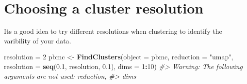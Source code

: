 \documentclass[
]{book}
\newenvironment{Shaded}{\begin{snugshade}}{\end{snugshade}}
\newcommand{\AttributeTok}[1]{\textcolor[rgb]{0.13,0.29,0.53}{#1}}
\newcommand{\CommentTok}[1]{\textcolor[rgb]{0.56,0.35,0.01}{\textit{#1}}}
\newcommand{\DecValTok}[1]{\textcolor[rgb]{0.00,0.00,0.81}{#1}}
\newcommand{\FloatTok}[1]{\textcolor[rgb]{0.00,0.00,0.81}{#1}}
\newcommand{\FunctionTok}[1]{\textcolor[rgb]{0.13,0.29,0.53}{\textbf{#1}}}
\newcommand{\NormalTok}[1]{#1}
\newcommand{\OtherTok}[1]{\textcolor[rgb]{0.56,0.35,0.01}{#1}}
\newcommand{\SpecialCharTok}[1]{\textcolor[rgb]{0.81,0.36,0.00}{\textbf{#1}}}
\newcommand{\StringTok}[1]{\textcolor[rgb]{0.31,0.60,0.02}{#1}}
\begin{document}
\hypertarget{section-9}{%
\subsubsection*{}\label{section-9}}

\hypertarget{choosing-a-cluster-resolution}{%
\section{Choosing a cluster resolution}\label{choosing-a-cluster-resolution}}

Its a good idea to try different resolutions when clustering to identify the varibility of your data.

\begin{Shaded}
\begin{Highlighting}[]
\NormalTok{resolution }\OtherTok{=} \DecValTok{2}
\NormalTok{pbmc }\OtherTok{\textless{}{-}} \FunctionTok{FindClusters}\NormalTok{(}\AttributeTok{object =}\NormalTok{ pbmc, }\AttributeTok{reduction =} \StringTok{"umap"}\NormalTok{, }\AttributeTok{resolution =} \FunctionTok{seq}\NormalTok{(}\FloatTok{0.1}\NormalTok{, resolution, }\FloatTok{0.1}\NormalTok{),}
    \AttributeTok{dims =} \DecValTok{1}\SpecialCharTok{:}\DecValTok{10}\NormalTok{)}
\CommentTok{\#\textgreater{} Warning: The following arguments are not used: reduction,}
\CommentTok{\#\textgreater{} dims}


\end{Highlighting}
\end{Shaded}
\end{document}
